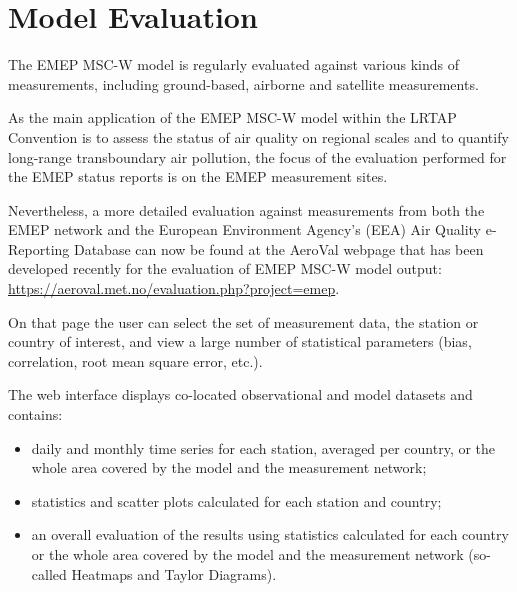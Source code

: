 \setcounter{page}{1}

\cleardoublepage
\chapter[2019 Model Evaluation]{Model Evaluation}
\label{ch:appx_modeleval}



The EMEP MSC-W model is regularly evaluated against various kinds of measurements, including ground-based, airborne and satellite measurements.

As the main application of the EMEP MSC-W model within the LRTAP Convention is to assess the status of air quality on regional scales and to quantify long-range transboundary air pollution, the focus of the evaluation performed for the EMEP status reports is on the EMEP measurement sites.

Nevertheless, a more detailed evaluation against measurements from both the EMEP network and the European Environment Agency's (EEA) Air Quality e-Reporting Database can now be found at the AeroVal webpage that has been developed recently for the evaluation
of EMEP MSC-W model output:\\
\url{https://aeroval.met.no/evaluation.php?project=emep}.

On that page the user can select the set of measurement data, the
station or country of interest, and view a large number of statistical
parameters (bias, correlation, root mean square error, etc.).

The web interface displays co-located observational and model datasets
and contains:
\begin{itemize}

\item daily and monthly time series for each station, averaged per
  country, or the whole area covered by the model and
  the measurement network;
\item statistics and scatter plots calculated for each station and country;
\item an overall evaluation of the results using statistics calculated for
  each country or the whole area covered by the model and the measurement
  network (so-called Heatmaps and Taylor Diagrams).
\end{itemize}

